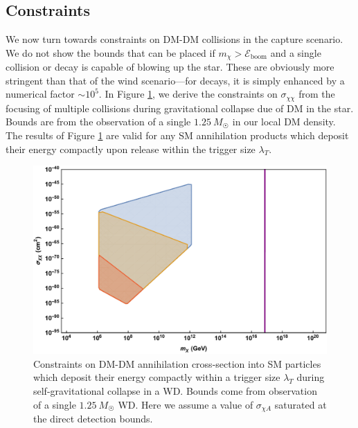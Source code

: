 \documentclass[preprintnumbers,amsmath,amssymb,prd,superscriptaddress]{revtex4}
\newcommand{\Eboom}{\mathcal{E}_\text{boom}}
\begin{document}
\subsection{Constraints}
We now turn towards constraints on DM-DM collisions in the capture scenario.
We do not show the bounds that can be placed if $m_\chi > \Eboom$ and a single collision or decay is capable of blowing up the star. 
These are obviously more stringent than that of the wind scenario---for decays, it is simply enhanced by a numerical factor $\sim 10^{5}$. 
In Figure \ref{fig:multicapture}, we derive the constraints on $\sigma_{\chi \chi}$ from the focusing of multiple collisions during gravitational collapse due of DM in the star.
Bounds are from the observation of a single $1.25 ~ M_{\astrosun}$ in our local DM density. 
The results of Figure \ref{fig:multicapture} are valid for any SM annihilation products which deposit their energy compactly upon release within the trigger size $\lambda_T$.
\begin{figure}
\includegraphics[scale=.35]{multicollision.pdf}
\caption{Constraints on DM-DM annihilation cross-section into SM particles which deposit their energy compactly within a trigger size $\lambda_T$ during self-gravitational collapse in a WD. Bounds come from observation of a single $1.25~M_{\astrosun}$ WD. Here we assume a value of $\sigma_{\chi A}$ saturated at the direct detection bounds.}
\label{fig:multicapture}
\end{figure}
\end{document}
